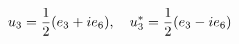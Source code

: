 \begin{equation}
u_{3}={1 \over 2}(e_{3}+ie_{6}), \quad u_{3}^{*}={1 \over 2}(e_{3}-ie_{6})
\end{equation}

